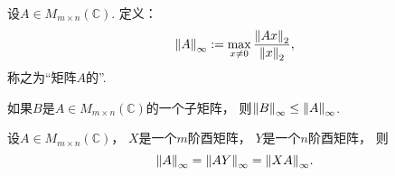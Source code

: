 \begin{definition}
设\(A \in M_{m \times n}(\mathbb{C})\).
定义：\begin{equation}
	\norm{A}_\infty
	:=
	\max_{x\neq0} \frac{\norm{Ax}_2}{\norm{x}_2},
\end{equation}
称之为“矩阵\(A\)的”.
\end{definition}

\begin{property}
如果\(B\)是\(A \in M_{m \times n}(\mathbb{C})\)的一个子矩阵，
则\(\norm{B}_\infty \leq \norm{A}_\infty\).
\end{property}

\begin{property}
设\(A \in M_{m \times n}(\mathbb{C})\)，
\(X\)是一个\(m\)阶酉矩阵，
\(Y\)是一个\(n\)阶酉矩阵，
则\begin{equation}
	\norm{A}_\infty
	= \norm{AY}_\infty
	= \norm{XA}_\infty.
\end{equation}
\end{property}

